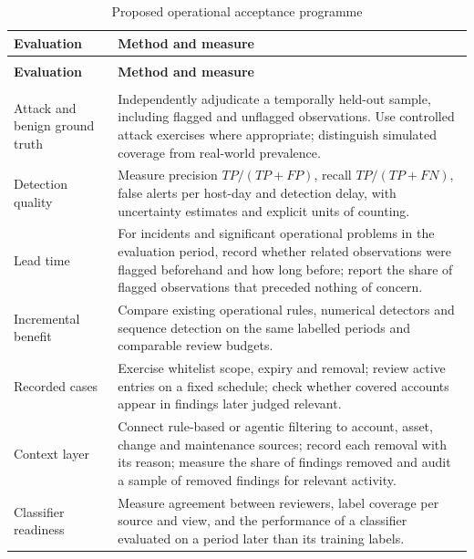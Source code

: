 \documentclass[11pt,a4paper]{article}
\begin{document}
\begingroup
\small
\begin{longtable}{>{\RaggedRight\arraybackslash}p{}>{\RaggedRight\arraybackslash}p{}}
\caption{Proposed operational acceptance programme}\label{tab:10}\\
\toprule
\rowcolor{pale} \textbf{Evaluation} & \textbf{Method and measure} \\
\midrule
\endfirsthead
\multicolumn{2}{l}{\small\itshape Table \thetable{} --- continued}\\
\toprule
\rowcolor{pale} \textbf{Evaluation} & \textbf{Method and measure} \\
\midrule
\endhead
\midrule
\multicolumn{2}{r}{\footnotesize Continued on the next page}\\
\endfoot
\bottomrule
\endlastfoot
Attack and benign ground truth & Independently adjudicate a temporally held-out sample, including flagged and unflagged observations. Use controlled attack exercises where appropriate; distinguish simulated coverage from real-world prevalence. \\[3pt]
Detection quality & Measure precision \(TP/(TP+FP)\), recall \(TP/(TP+FN)\), false alerts per host-day and detection delay, with uncertainty estimates and explicit units of counting. \\[3pt]
Lead time & For incidents and significant operational problems in the evaluation period, record whether related observations were flagged beforehand and how long before; report the share of flagged observations that preceded nothing of concern. \\[3pt]
Incremental benefit & Compare existing operational rules, numerical detectors and sequence detection on the same labelled periods and comparable review budgets. \\[3pt]
Recorded cases & Exercise whitelist scope, expiry and removal; review active entries on a fixed schedule; check whether covered accounts appear in findings later judged relevant. \\[3pt]
Context layer & Connect rule-based or agentic filtering to account, asset, change and maintenance sources; record each removal with its reason; measure the share of findings removed and audit a sample of removed findings for relevant activity. \\[3pt]
Classifier readiness & Measure agreement between reviewers, label coverage per source and view, and the performance of a classifier evaluated on a period later than its training labels. \\[3pt]

\end{longtable}
\end{document}
